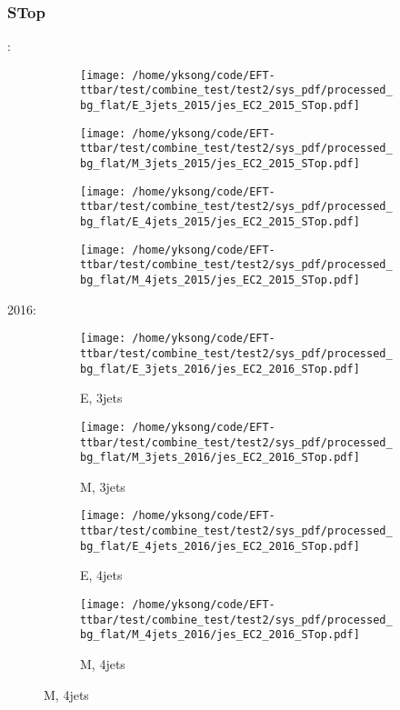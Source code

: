 \documentclass{beamer}
\begin{document}
\begin{frame}
\frametitle{STop}
\fontsize{5}{1}:
\begin{figure}
\centering
\begin{subfigure}[b]{0.24\textwidth}
\texttt{[image: /home/yksong/code/EFT-ttbar/test/combine\_test/test2/sys\_pdf/processed\_bg\_flat/E\_3jets\_2015/jes\_EC2\_2015\_STop.pdf]}
\end{subfigure}
\begin{subfigure}[b]{0.24\textwidth}
\texttt{[image: /home/yksong/code/EFT-ttbar/test/combine\_test/test2/sys\_pdf/processed\_bg\_flat/M\_3jets\_2015/jes\_EC2\_2015\_STop.pdf]}
\end{subfigure}
\begin{subfigure}[b]{0.24\textwidth}
\texttt{[image: /home/yksong/code/EFT-ttbar/test/combine\_test/test2/sys\_pdf/processed\_bg\_flat/E\_4jets\_2015/jes\_EC2\_2015\_STop.pdf]}
\end{subfigure}
\begin{subfigure}[b]{0.24\textwidth}
\texttt{[image: /home/yksong/code/EFT-ttbar/test/combine\_test/test2/sys\_pdf/processed\_bg\_flat/M\_4jets\_2015/jes\_EC2\_2015\_STop.pdf]}
\end{subfigure}
\end{figure}
2016:
\begin{figure}
\centering
\begin{subfigure}[b]{0.24\textwidth}
\texttt{[image: /home/yksong/code/EFT-ttbar/test/combine\_test/test2/sys\_pdf/processed\_bg\_flat/E\_3jets\_2016/jes\_EC2\_2016\_STop.pdf]}
\captionsetup{font=tiny}
\caption{E, 3jets}
\end{subfigure}
\begin{subfigure}[b]{0.24\textwidth}
\texttt{[image: /home/yksong/code/EFT-ttbar/test/combine\_test/test2/sys\_pdf/processed\_bg\_flat/M\_3jets\_2016/jes\_EC2\_2016\_STop.pdf]}
\captionsetup{font=tiny}
\caption{M, 3jets}
\end{subfigure}
\begin{subfigure}[b]{0.24\textwidth}
\texttt{[image: /home/yksong/code/EFT-ttbar/test/combine\_test/test2/sys\_pdf/processed\_bg\_flat/E\_4jets\_2016/jes\_EC2\_2016\_STop.pdf]}
\captionsetup{font=tiny}
\caption{E, 4jets}
\end{subfigure}
\begin{subfigure}[b]{0.24\textwidth}
\texttt{[image: /home/yksong/code/EFT-ttbar/test/combine\_test/test2/sys\_pdf/processed\_bg\_flat/M\_4jets\_2016/jes\_EC2\_2016\_STop.pdf]}
\captionsetup{font=tiny}
\caption{M, 4jets}
\end{subfigure}
\end{figure}
\end{frame}
\end{document}
